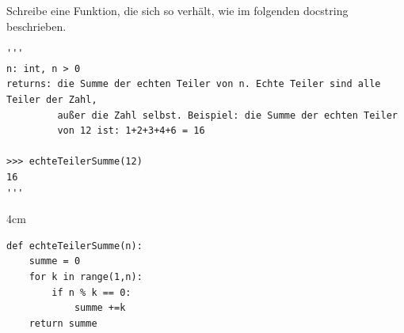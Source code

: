 \question[4] 
Schreibe eine Funktion, die sich so verhält, wie im folgenden docstring beschrieben.
\begin{lstlisting}
'''
n: int, n > 0
returns: die Summe der echten Teiler von n. Echte Teiler sind alle Teiler der Zahl,
         außer die Zahl selbst. Beispiel: die Summe der echten Teiler
         von 12 ist: 1+2+3+4+6 = 16
 
>>> echteTeilerSumme(12)
16
'''

\end{lstlisting}
\begin{solutionbox}{4cm}
\begin{lstlisting}
def echteTeilerSumme(n):
    summe = 0
    for k in range(1,n):
        if n % k == 0:
            summe +=k
    return summe
\end{lstlisting}
\end{solutionbox}
